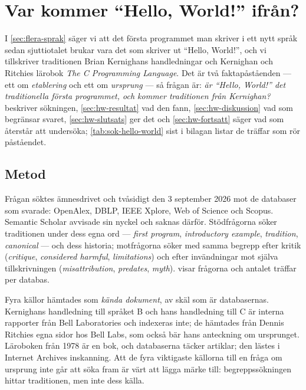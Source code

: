 \chapter{Var kommer \enquote{Hello, World!} ifrån?}
\label{app:hello-world}

I \cref{sec:flera-sprak} säger vi att det första programmet man skriver i
ett nytt språk sedan sjuttiotalet brukar vara det som skriver ut
\enquote{Hello, World!}, och vi tillskriver traditionen Brian Kernighans
handledningar och Kernighan och Ritchies lärobok \emph{The C Programming
Language}\autocite{KernighanRitchie1978}.  Det är två faktapåståenden ---
ett om \emph{etablering} och ett om \emph{ursprung} --- så frågan är:
\emph{är \enquote{Hello, World!} det traditionella första programmet, och
kommer traditionen från Kernighan?}   beskriver
sökningen, \cref{sec:hw-resultat} vad den fann, \cref{sec:hw-diskussion}
vad som begränsar svaret, \cref{sec:hw-slutsats} ger det och
\cref{sec:hw-fortsatt} säger vad som återstår att undersöka;
\cref{tab:sok-hello-world} sist i bilagan listar de träffar som rör
påståendet.

\section{Metod}
\label{sec:hw-metod}

Frågan söktes ämnesdrivet och tvåsidigt den 3 september 2026 mot de
databaser som svarade: OpenAlex, DBLP, IEEE Xplore, Web of Science och
Scopus.  Semantic Scholar avvisade sin nyckel och saknas därför.
Stödfrågorna söker traditionen under dess egna ord --- \emph{first
program}, \emph{introductory example}, \emph{tradition}, \emph{canonical}
--- och dess historia; motfrågorna söker med samma begrepp efter kritik
(\emph{critique}, \emph{considered harmful}, \emph{limitations}) och
efter invändningar mot själva tillskrivningen (\emph{misattribution},
\emph{predates}, \emph{myth}).   visar frågorna
och antalet träffar per databas.

Fyra källor hämtades som \emph{kända dokument}, av skäl som är
databasernas.  Kernighans handledning till språket
B\autocite{Kernighan1973BTutorial} och hans handledning till
C\autocite{Kernighan1974CTutorial} är interna rapporter från Bell
Laboratories och indexeras inte; de hämtades från Dennis Ritchies egna
sidor hos Bell Labs, som också bär hans anteckning om
ursprunget\autocite{Ritchie1997BNote}.  Läroboken från
1978\autocite{KernighanRitchie1978} är en bok, och databaserna täcker
artiklar; den lästes i Internet Archives inskanning.  Att de fyra
viktigaste källorna till en fråga om ursprung inte går att söka fram är
värt att lägga märke till: begreppssökningen hittar traditionen, men
inte dess källa.

